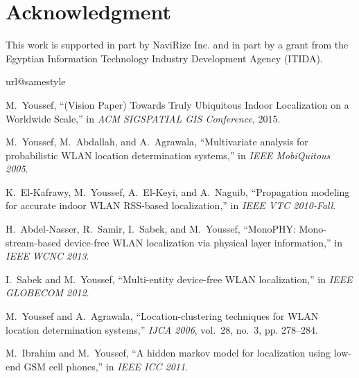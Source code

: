 \documentclass[conference]{IEEEtran}
\begin{document}
\section{Acknowledgment}
This work is supported in part by NaviRize Inc. and in part by a grant from the Egyptian Information Technology Industry Development Agency (ITIDA).

\begin{thebibliography}{10}
\providecommand{\url}[1]{#1}
\csname url@samestyle\endcsname
\providecommand{\newblock}{\relax}
\providecommand{\bibinfo}[2]{#2}
\providecommand{\BIBentrySTDinterwordspacing}{\spaceskip=0pt\relax}
\providecommand{\BIBentryALTinterwordstretchfactor}{4}
\providecommand{\BIBentryALTinterwordspacing}{\spaceskip=\fontdimen2\font plus
\BIBentryALTinterwordstretchfactor\fontdimen3\font minus
  \fontdimen4\font\relax}
\providecommand{\BIBforeignlanguage}[2]{{\expandafter\ifx\csname l@#1\endcsname\relax
\typeout{** WARNING: IEEEtran.bst: No hyphenation pattern has been}\typeout{** loaded for the language `#1'. Using the pattern for}\typeout{** the default language instead.}\else
\language=\csname l@#1\endcsname
\fi
#2}}
\providecommand{\BIBdecl}{\relax}
\BIBdecl

M.~Youssef, ``{(Vision Paper) Towards Truly Ubiquitous Indoor Localization on a
  Worldwide Scale},'' in \emph{ACM SIGSPATIAL GIS Conference}, 2015.

M.~Youssef, M.~Abdallah, and A.~Agrawala, ``Multivariate analysis for
  probabilistic {WLAN} location determination systems,'' in \emph{IEEE
  MobiQuitous 2005}.

K.~El-Kafrawy, M.~Youssef, A.~El-Keyi, and A.~Naguib, ``Propagation modeling
  for accurate indoor {WLAN RSS-based} localization,'' in \emph{IEEE VTC
  2010-Fall}.

H.~Abdel-Nasser, R.~Samir, I.~Sabek, and M.~Youssef, ``{MonoPHY}:
  Mono-stream-based device-free {WLAN} localization via physical layer
  information,'' in \emph{IEEE WCNC 2013}.

I.~Sabek and M.~Youssef, ``Multi-entity device-free {WLAN} localization,'' in
  \emph{IEEE GLOBECOM 2012}.

M.~Youssef and A.~Agrawala, ``Location-clustering techniques for {WLAN}
  location determination systems,'' \emph{IJCA 2006}, vol.~28, no.~3, pp.
  278--284.

M.~Ibrahim and M.~Youssef, ``A hidden markov model for localization using
  low-end {GSM} cell phones,'' in \emph{IEEE ICC 2011}.


\end{thebibliography}
\end{document}
